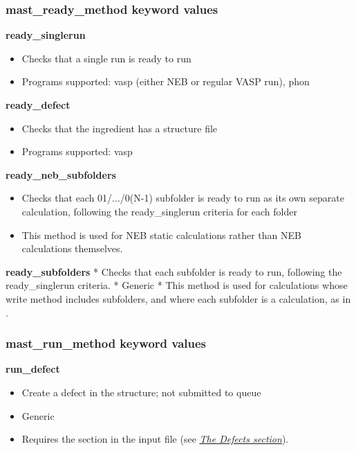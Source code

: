 \documentclass[letterpaper,10pt,english]{sphinxmanual}
\begin{document}
\subsubsection{mast\_ready\_method keyword values}
\label{3_1_2_ingredients:mast-ready-method-keyword-values}
\textbf{ready\_singlerun}
\begin{itemize}
\item {} 
Checks that a single run is ready to run

\item {} 
Programs supported: vasp (either NEB or regular VASP run), phon

\end{itemize}

\textbf{ready\_defect}
\begin{itemize}
\item {} 
Checks that the ingredient has a structure file

\item {} 
Programs supported: vasp

\end{itemize}

\textbf{ready\_neb\_subfolders}
\begin{itemize}
\item {} 
Checks that each 01/.../0(N-1) subfolder is ready to run as its own separate calculation, following the ready\_singlerun criteria for each folder

\item {} 
This method is used for NEB static calculations rather than NEB calculations themselves.

\end{itemize}

\textbf{ready\_subfolders}
*  Checks that each subfolder is ready to run, following the ready\_singlerun criteria.
*  Generic
*  This method is used for calculations whose write method includes subfolders, and where each subfolder is a calculation, as in .


\subsubsection{mast\_run\_method keyword values}
\label{3_1_2_ingredients:mast-run-method-keyword-values}
\textbf{run\_defect}
\begin{itemize}
\item {} 
Create a defect in the structure; not submitted to queue

\item {} 
Generic

\item {} 
Requires the  section in the input file (see {\hyperref[3_1_5_defects::doc]{\emph{The Defects section}}}).

\end{itemize}
\end{document}
